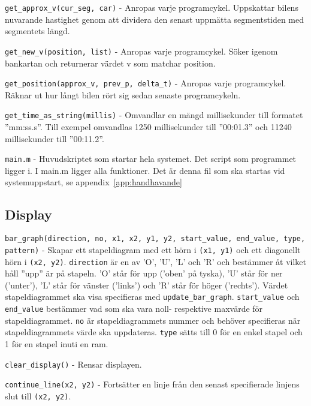 \texttt{get\_approx\_v(cur\_seg, car)} - Anropas varje programcykel. Uppskattar
bilens nuvarande hastighet genom att dividera den senast uppmätta segmentstiden
med segmentets längd.


\texttt{get\_new\_v(position, list)} - Anropas varje programcykel. Söker igenom
bankartan och returnerar värdet v som matchar position.

\texttt{get\_position(approx\_v, prev\_p, delta\_t)} - Anropas varje
programcykel. Räknar ut hur långt bilen rört sig sedan senaste programcykeln.


\texttt{get\_time\_as\_string(millis)} - Omvandlar en mängd millisekunder till
formatet ''mm:ss.s''. Till exempel omvandlas 1250 millisekunder till ''00:01.3'' och
11240 millisekunder till ''00:11.2''.

\texttt{main.m} - Huvudskriptet som startar hela systemet. Det script som
programmet ligger i. I main.m ligger alla funktioner. Det är denna fil som ska
startas vid systemuppstart, se appendix~\ref{app:handhavande}


\subsection{Display}
\label{app:funktioner och filer:display}

\texttt{bar\_graph(direction, no, x1, x2, y1, y2, start\_value, end\_value,
type, pattern)} - Skapar ett stapeldiagram med ett hörn i \texttt{(x1, y1)} och
ett diagonellt hörn i \texttt{(x2, y2)}. \texttt{direction} är en av 'O', 'U',
'L' och 'R' och bestämmer åt vilket håll ''upp'' är på stapeln. 'O' står för upp
('oben' på tyska), 'U' står för ner ('unter'), 'L' står för vänster ('links')
och 'R' står för höger ('rechts'). Värdet stapeldiagrammet ska visa specifieras
med \texttt{update\_bar\_graph}. \texttt{start\_value} och \texttt{end\_value}
bestämmer vad som ska vara noll- respektive maxvärde för stapeldiagrammet.
\texttt{no} är stapeldiagrammets nummer och behöver specifieras när
stapeldiagrammets värde ska uppdateras. \texttt{type} sätts till 0 för en enkel
stapel och 1 för en stapel inuti en ram.

\texttt{clear\_display()} - Rensar displayen.

\texttt{continue\_line(x2, y2)} - Fortsätter en linje från den senast specifierade
linjens slut till \texttt{(x2, y2)}.

